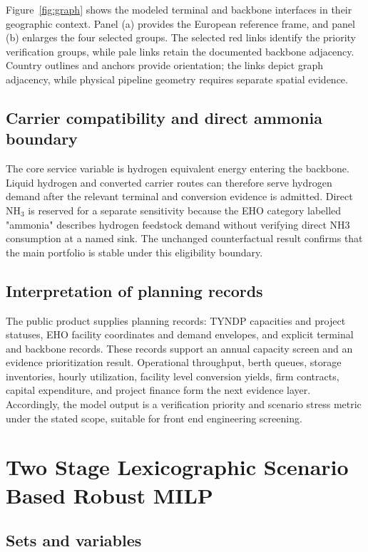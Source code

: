 \documentclass{ieeeaccess}
\newcommand{\NHthree}{NH$_3$}
\begin{document}
Figure~\ref{fig:graph} shows the modeled terminal and backbone interfaces in their geographic context. Panel (a) provides the European reference frame, and panel (b) enlarges the four selected groups. The selected red links identify the priority verification groups, while pale links retain the documented backbone adjacency. Country outlines and anchors provide orientation; the links depict graph adjacency, while physical pipeline geometry requires separate spatial evidence.

\subsection{Carrier compatibility and direct ammonia boundary}

The core service variable is hydrogen equivalent energy entering the backbone. Liquid hydrogen and converted carrier routes can therefore serve hydrogen demand after the relevant terminal and conversion evidence is admitted. Direct \NHthree{} is reserved for a separate sensitivity because the EHO category labelled "ammonia" describes hydrogen feedstock demand without verifying direct NH3 consumption at a named sink. The unchanged counterfactual result confirms that the main portfolio is stable under this eligibility boundary.

\subsection{Interpretation of planning records}

The public product supplies planning records: TYNDP capacities and project statuses, EHO facility coordinates and demand envelopes, and explicit terminal and backbone records. These records support an annual capacity screen and an evidence prioritization result. Operational throughput, berth queues, storage inventories, hourly utilization, facility level conversion yields, firm contracts, capital expenditure, and project finance form the next evidence layer. Accordingly, the model output is a verification priority and scenario stress metric under the stated scope, suitable for front end engineering screening.

\section{Two Stage Lexicographic Scenario Based Robust MILP}
\label{sec:model}

\subsection{Sets and variables}
\end{document}
